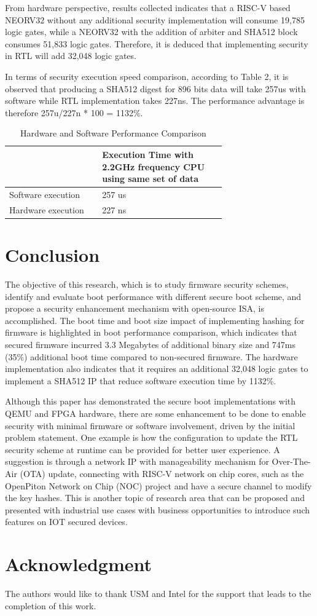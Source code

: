 \documentclass[]{rsos}%
\begin{document}
From hardware perspective, results collected indicates that a RISC-V based NEORV32 without any additional security implementation will consume 19,785 logic gates, while a NEORV32 with the addition of arbiter and SHA512 block consumes 51,833 logic gates. Therefore, it is deduced that implementing security in RTL will add 32,048 logic gates.

In terms of security execution speed comparison, according to Table 2, it is observed that producing a SHA512 digest for 896 bits data will take 257us with software while RTL implementation takes 227ns. The performance advantage is therefore 257u/227n * 100 = 1132\%.

\begin{table}[hbt!]
\caption{Hardware and Software Performance Comparison}
    \begin{tabular}{|p{0.3\linewidth} | p{0.4\linewidth} |}
        \hline
         & Execution Time with 2.2GHz frequency CPU using same set of data \\
        \hline 
        Software execution & 257 us  \\
        \hline
        Hardware execution & 227 ns \\
        \hline
    \end{tabular}
\end{table}

\section{ Conclusion}
The objective of this research, which is to study firmware security schemes, identify and evaluate boot performance with different secure boot scheme, and propose a security enhancement mechanism with open-source ISA, is accomplished. The boot time and boot size impact of implementing hashing for firmware is highlighted in boot performance comparison, which indicates that secured firmware incurred 3.3 Megabytes of additional binary size and 747ms (35\%) additional boot time compared to non-secured firmware. The hardware implementation also indicates that it requires an additional 32,048 logic gates to implement a SHA512 IP that reduce software execution time by 1132\%.

Although this paper has demonstrated the secure boot implementations with QEMU and FPGA hardware, there are some enhancement to be done to enable security with minimal firmware or software involvement, driven by the initial problem statement. One example is how the configuration to update the RTL security scheme at runtime can be provided for better user experience. A suggestion is through a network IP with manageability mechanism for Over-The-Air (OTA) update, connecting with RISC-V network on chip cores, such as the OpenPiton Network on Chip (NOC) project and have a secure channel to modify the key hashes. This is another topic of research area that can be proposed and presented with industrial use cases with business opportunities to introduce such features on IOT secured devices.

\section*{Acknowledgment}
The authors would like to thank USM and Intel for the support that leads to the completion of this work.

 

\end{document}
